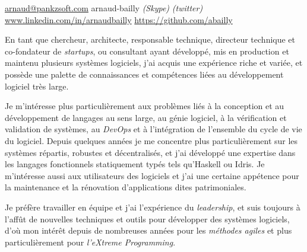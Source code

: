 \documentclass[12pt,a4paper]{article}
\begin{document}
\sloppy


\noindent\href{mailto:arnaud.at.pankzsoft.dot.com}{arnaud\mbox{}@\mbox{}pankzsoft.com}\sbull
{\newnums arnaud-bailly} \emph{(Skype)} \emph{(twitter)}\sbull
\href{http://www.linkedin.com/in/arnaudbailly}{www.linkedin.com/in/arnaudbailly} \sbull
\href{https://github.com/abailly}{https://github.com/abailly} \\

\spacedhrule{0.9em}{-0.4em}  %


\begin{multicols}{2}  %
  En tant que chercheur, architecte, responsable technique, directeur technique et co-fondateur de \emph{startups}, ou consultant ayant développé, mis en production et maintenu plusieurs systèmes logiciels, j'ai acquis une expérience riche et variée, et possède une palette de connaissances et compétences liées au développement logiciel très large.

  Je m'intéresse plus particulièrement aux problèmes liés à la conception et au développement de langages au sens large, au génie logiciel, à la vérification et validation de systèmes, au \emph{DevOps} et à l'intégration de l'ensemble du cycle de vie du logiciel. Depuis quelques années je me concentre plus particulièrement sur les systèmes répartis, robustes et décentralisés, et j'ai développé une expertise dans les langages fonctionnels statiquement typés tels qu'Haskell ou Idris. Je m'intéresse aussi aux utilisateurs des logiciels et j'ai une certaine appétence pour la maintenance et la rénovation d'applications dites patrimoniales.

  Je préfère travailler en équipe et j'ai l'expérience du \emph{leadership}, et suis toujours à l'affût de nouvelles techniques et outils pour développer des systèmes logiciels, d'où mon intérêt depuis de nombreuses années pour les \emph{méthodes agiles} et plus particulièrement pour \emph{l'eXtreme Programming}.
\end{multicols}

\end{document}
